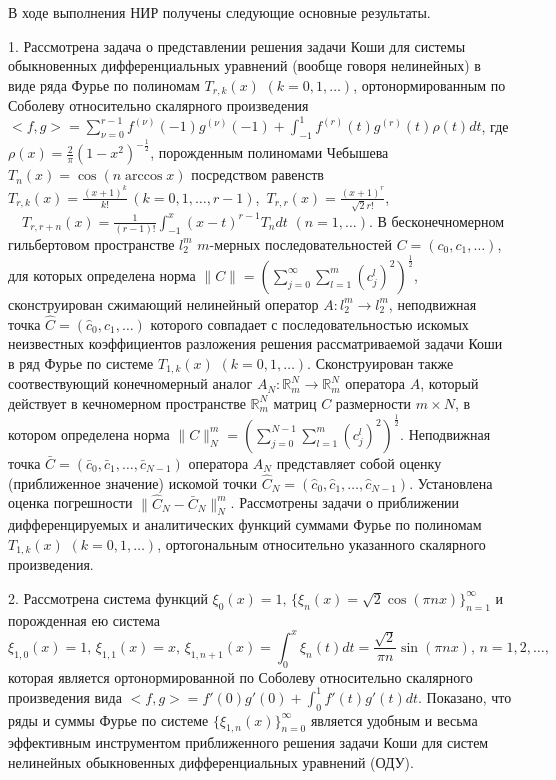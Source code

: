 \Conclusion

В ходе выполнения НИР получены следующие основные результаты.

1. Рассмотрена задача о представлении решения задачи Коши для системы  обыкновенных  дифференциальных  уравнений (вообще говоря нелинейных) в виде  ряда  Фурье по полиномам $T_{r,k}(x)$ $(k=0,1,\ldots)$, ортонормированным по Соболеву относительно скалярного произведения
$<f,g>=\sum_{\nu=0}^{r-1}f^{(\nu)}(-1)g^{(\nu)}(-1)+\int_{-1}^1 f^{(r)}(t)g^{(r)}(t)\rho(t)dt$, где $\rho(x)=\frac2\pi(1-x^2)^{-\frac12}$, порожденным полиномами Чебышева $T_n(x)=\cos(n\arccos x)$ посредством равенств $T_{r,k}(x) =\frac{(x+1)^k}{k!}\, ( k=0,1,\ldots, r-1)$,\, $T_{r,r}(x) =\frac{(x+1)^r}{\sqrt{2}r!}$,\, $\quad T_{r,r+n}(x) =\frac{1}{(r-1)!}\int_{-1}^x(x-t)^{r-1}T_{n}dt\,\, ( n=1,\ldots)$.  В бесконечномерном гильбертовом  пространстве $l_2^m$ $m$-мерных последовательностей  $C=(c_0,c_1,\ldots)$, для которых определена норма
$\|C\|=\left(\sum\nolimits_{j=0}^\infty \sum\nolimits_{l=1}^{m}(c_j^l)^2\right)^\frac12$, сконструирован сжимающий нелинейный оператор  $A: l_2^m\to l_2^m$,  неподвижная точка $\hat C=(\hat c_0,\hat c_1,\ldots)$ которого совпадает с последовательностью  искомых неизвестных коэффициентов разложения решения рассматриваемой задачи Коши в ряд Фурье по системе $T_{1,k}(x)$ $(k=0,1,\ldots)$. Сконструирован также соотвествующий конечномерный аналог $A_N:\mathbb{R}^N_m\to \mathbb{R}^N_m$ оператора $A$, который действует в кечномерном пространстве  $\mathbb{R}^N_m$ матриц $C$ размерности $m\times N$, в котором определена норма
$\|C\|_N^m=\left(\sum\nolimits_{j=0}^{N-1} \sum\nolimits_{l=1}^{m}(c_j^l)^2\right)^\frac12$. Неподвижная точка $\bar C=(\bar c_0,\bar c_1,\ldots, \bar c_{N-1})$ оператора $A_N$ представляет собой оценку (приближенное значение) искомой точки $\hat C_N=(\hat c_0,\hat c_1,\ldots, \hat c_{N-1})$. Установлена оценка погрешности $\|\hat C_N-\bar C_N\|_N^m$. Рассмотрены задачи о приближении дифференцируемых и аналитических функций суммами Фурье по полиномам $T_{1,k}(x)$ $(k=0,1,\ldots)$, ортогональным относительно указанного скалярного произведения.


2. Рассмотрена система функций  $\xi_0(x)=1,\, \{\xi_n(x)=\sqrt{2}\cos(\pi nx)\}_{n=1}^\infty$ и порожденная ею система
$$
\xi_{1,0}(x)=1,\, \xi_{1,1}(x)=x,\, \xi_{1,n+1}(x)=\int_0^x \xi_{n}(t)dt=\frac{\sqrt{2}}{\pi n}\sin(\pi nx),\, n=1,2,\ldots,
$$
которая является ортонормированной по Соболеву относительно скалярного произведения  вида $<f,g>=f'(0)g'(0)+\int_{0}^{1}f'(t)g'(t)dt$. Показано, что ряды и суммы Фурье по системе $\{\xi_{1,n}(x)\}_{n=0}^\infty$  является удобным и весьма эффективным инструментом приближенного решения задачи Коши для систем нелинейных обыкновенных дифференциальных уравнений (ОДУ).

